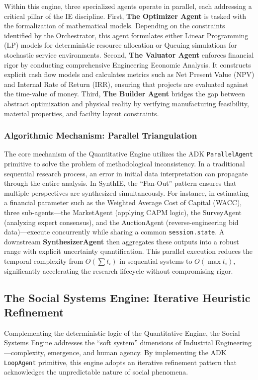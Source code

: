 \documentclass[12pt,a4paper]{article}
\begin{document}
Within this engine, three specialized agents operate in parallel, each addressing a critical pillar of the IE discipline. First, \textbf{The Optimizer Agent} is tasked with the formalization of mathematical models. Depending on the constraints identified by the Orchestrator, this agent formulates either Linear Programming (LP) models for deterministic resource allocation or Queuing simulations for stochastic service environments. Second, \textbf{The Valuator Agent} enforces financial rigor by conducting comprehensive Engineering Economic Analysis. It constructs explicit cash flow models and calculates metrics such as Net Present Value (NPV) and Internal Rate of Return (IRR), ensuring that projects are evaluated against the time-value of money. Third, \textbf{The Builder Agent} bridges the gap between abstract optimization and physical reality by verifying manufacturing feasibility, material properties, and facility layout constraints.

\subsubsection{Algorithmic Mechanism: Parallel Triangulation}

The core mechanism of the Quantitative Engine utilizes the ADK \texttt{ParallelAgent} primitive to solve the problem of methodological inconsistency. In a traditional sequential research process, an error in initial data interpretation can propagate through the entire analysis. In SynthIE, the ``Fan-Out'' pattern ensures that multiple perspectives are synthesized simultaneously. For instance, in estimating a financial parameter such as the Weighted Average Cost of Capital (WACC), three sub-agents—the MarketAgent (applying CAPM logic), the SurveyAgent (analyzing expert consensus), and the AuctionAgent (reverse-engineering bid data)—execute concurrently while sharing a common \texttt{session.state}. A downstream \textbf{SynthesizerAgent} then aggregates these outputs into a robust range with explicit uncertainty quantification. This parallel execution reduces the temporal complexity from $O(\sum t_i)$ in sequential systems to $O(\max t_i)$, significantly accelerating the research lifecycle without compromising rigor.

\subsection{The Social Systems Engine: Iterative Heuristic Refinement}

Complementing the deterministic logic of the Quantitative Engine, the Social Systems Engine addresses the ``soft system'' dimensions of Industrial Engineering—complexity, emergence, and human agency. By implementing the ADK \texttt{LoopAgent} primitive, this engine adopts an iterative refinement pattern that acknowledges the unpredictable nature of social phenomena.
\end{document}

